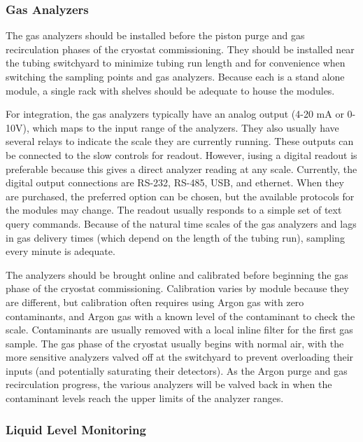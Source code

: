 \subsubsection{Gas Analyzers}
\label{sec:fdgen-slow-cryo-install-ga}

The gas analyzers should be installed before the piston purge and gas recirculation phases of the cryostat commissioning. They should be installed near the tubing switchyard to minimize tubing run length and for convenience when switching the sampling points and gas analyzers. Because each is a stand alone module, a single rack with shelves should be adequate to house the modules.

For integration, the gas analyzers typically have an analog output (4-20 \si{mA} or 0-10\si{V}), which maps to the input range of the analyzers. They also usually have several relays to indicate the scale they are currently running. These outputs can be connected to the slow controls for readout. However, iusing a digital readout is preferable because this gives a direct analyzer reading at any scale. Currently, the digital output connections are RS-232, RS-485, USB, and ethernet. When they are purchased, the preferred option can be chosen, but the available protocols for the modules may change. The readout usually responds to a simple set of text query commands. Because of the natural time scales of the gas analyzers and lags in gas delivery times (which depend on the length of the tubing run), sampling every minute is adequate.

The analyzers should be brought online and calibrated before beginning the gas phase of the cryostat commissioning.  Calibration varies by module because they are different, but calibration often requires using Argon gas with zero contaminants, and Argon gas with a known level of the contaminant to check the scale. Contaminants are usually removed with a local inline filter for the first gas sample. The gas phase of the cryostat usually begins with normal air, with the more sensitive analyzers valved off at the switchyard to prevent overloading their inputs (and potentially saturating their detectors). As the Argon purge and gas recirculation progress, the various analyzers will be valved back in when the contaminant levels reach the upper limits of the analyzer ranges. 

\subsubsection{Liquid Level Monitoring}
\label{sec:fdgen-slow-cryo-install-llm}

